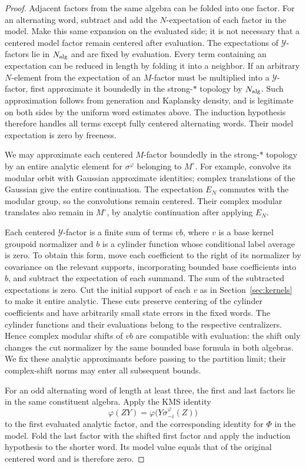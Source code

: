 \begin{proof}
Adjacent factors from the same algebra can be folded into one factor.
For an alternating word, subtract and add the $N$-expectation of each
factor in the model. Make this same expansion on the evaluated side;
it is not necessary that a centered model factor remain centered after
evaluation. The expectations of $\mathcal Y$-factors lie in
$N_{\rm alg}$ and are fixed by evaluation. Every term containing an
expectation can be reduced in length by folding it into a neighbor.
If an arbitrary $N$-element from the expectation of an $M$-factor must
be multiplied into a $\mathcal Y$-factor, first approximate it boundedly
in the strong-$*$ topology by $N_{\rm alg}$. Such approximation follows
from generation and Kaplansky density, and is legitimate on both sides
by the uniform word estimates above. The induction hypothesis therefore
handles all terms except fully centered alternating words. Their model
expectation is zero by freeness.

We may approximate each centered $M$-factor boundedly in the strong-$*$
topology by an entire analytic element for $\sigma^\varphi$ belonging
to $M^\circ$. For example, convolve its modular orbit with Gaussian
approximate identities; complex translations of the Gaussian give the
entire continuation. The expectation $E_N$ commutes with the modular
group, so the convolutions remain centered. Their complex modular
translates also remain in $M^\circ$, by analytic continuation after
applying $E_N$.

Each centered $\mathcal Y$-factor is a finite sum of terms $vb$, where
$v$ is a base kernel groupoid normalizer and $b$ is a cylinder function
whose conditional label average is zero. To obtain this form, move each
coefficient to the right of its normalizer by covariance on the relevant
supports, incorporating bounded base coefficients into $b$, and subtract
the expectation of each summand. The sum of the subtracted expectations
is zero. Cut the initial support of each $v$ as in
Section~\ref{sec:kernels} to make it entire analytic. These cuts preserve
centering of the cylinder coefficients and have arbitrarily small
state errors in the fixed words. The cylinder functions and their
evaluations belong to the respective centralizers. Hence complex
modular shifts of $vb$ are compatible with evaluation: the shift only
changes the cut normalizer by the same bounded base formula in both
algebras. We fix these analytic approximants before passing to the
partition limit; their complex-shift norms may enter all subsequent
bounds.

For an odd alternating word of length at least three, the first and
last factors lie in the same constituent algebra. Apply the KMS
identity
\[
 \varphi(ZY)=\varphi\bigl(Y\sigma^\varphi_{-i}(Z)\bigr)
\]
to the first evaluated analytic factor, and the corresponding identity
for $\Phi$ in the model. Fold the last factor with the shifted first
factor and apply the induction hypothesis to the shorter word. Its
model value equals that of the original centered word and is therefore
zero.


\end{proof}
